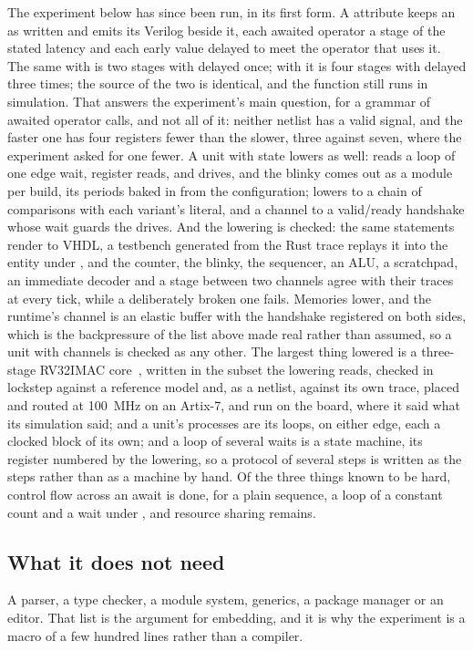 The experiment below has since been run, in its first form. A
\code{\#[pipeline(mul = 1, add = 1)]} attribute keeps an  as written and emits its Verilog beside it, each awaited operator
a stage of the stated latency and each early value delayed to meet
the operator that uses it. The same  with 
is two stages with  delayed once; with  it is
four stages with  delayed three times; the source of the two is
identical, and the function still runs in simulation. That answers the
experiment's main question, for a grammar of awaited operator calls,
and not all of it: neither netlist has a valid signal, and the faster
one has four registers fewer than the slower, three against seven,
where the experiment asked for one fewer. A unit with state lowers
as well: \code{\#[lower]} reads a  loop of one edge wait,
register reads,  and drives, and the blinky comes out
as a module per build, its periods baked in from the configuration;
 lowers to a chain of comparisons with each variant's
literal, and a channel to a valid/ready handshake whose wait guards
the drives. And the lowering is checked: the same statements render to
VHDL, a testbench generated from the Rust trace replays it into the
entity under , and the counter, the blinky, the sequencer,
an ALU, a scratchpad, an immediate decoder and a stage between two
channels agree with their
traces at every tick, while a deliberately broken one fails. Memories
lower, and the runtime's channel is an elastic buffer with the
handshake registered on both sides, which is the backpressure of the
list above made real rather than assumed, so a unit with channels is
checked as any other. The largest thing lowered is a three-stage RV32IMAC
core~\cite{vreteno}, written in the subset the lowering reads,
checked in lockstep against a reference model and, as a netlist,
against its own trace, placed and routed at 100~MHz on an Artix-7,
and run on the board, where it said what its simulation said; and a
unit's processes are its loops, on either edge, each a
clocked block of its own; and a loop of several waits is a state
machine, its register numbered by the lowering, so a protocol of
several steps is written as the steps rather than as a machine by
hand. Of the three things known to be hard, control flow across an
await is done, for a plain sequence, a loop of a constant count and a
wait under , and resource sharing remains.

\subsection{What it does not need}

A parser, a type checker, a module system, generics, a package manager or
an editor. That list is the argument for embedding, and it is why the
experiment is a macro of a few hundred lines rather than a compiler.
